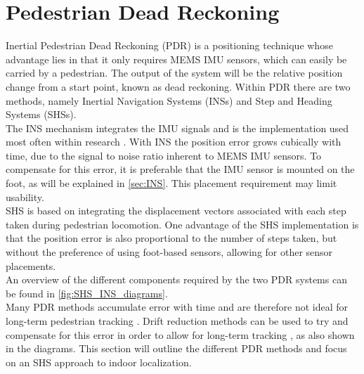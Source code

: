 \section{Pedestrian Dead Reckoning}
Inertial Pedestrian Dead Reckoning (PDR) is a positioning technique whose advantage lies in that it only requires MEMS IMU sensors, which can easily be carried by a pedestrian. The output of the system will be the relative position change from a start point, known as dead reckoning. Within PDR there are two methods, namely Inertial Navigation Systems (INSs) and Step and Heading Systems (SHSs).\\
The INS mechanism integrates the IMU signals and is the implementation used most often within research \cite{Diez2018b}. With INS the position error grows cubically with time, due to the signal to noise ratio inherent to MEMS IMU sensors\cite{Harle2013}. To compensate for this error, it is preferable that the IMU sensor is mounted on the foot, as will be explained in \cref{sec:INS}. This placement requirement may limit usability. \\
SHS is based on integrating the displacement vectors associated with each step taken during pedestrian locomotion. One advantage of the SHS implementation is that the position error is also proportional to the number of steps taken, but without the preference of using foot-based sensors, allowing for other sensor placements. \\
An overview of the different components required by the two PDR systems can be found in \cref{fig:SHS_INS_diagrams}.\\ Many PDR methods accumulate error with time and are therefore not ideal for long-term pedestrian tracking \cite{Hardegger2012}. Drift reduction methods can be used to try and compensate for this error in order to allow for long-term tracking \cite{MunozDiaz2019a}, as also shown in the diagrams. This section will outline the different PDR methods and focus on an SHS approach to indoor localization.


